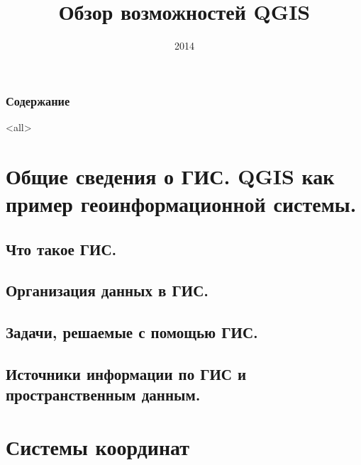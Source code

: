 \documentclass[ignorenonframetext,russian,hyperref={pdftex,unicode}]{beamer}        %
\title{Обзор возможностей QGIS}
\institute{NextGIS}
\date{2014}
\begin{document}
\frame{\titlepage}

\begin{frame}[allowframebreaks]
    \frametitle{Содержание}
       \tableofcontents
\end{frame}



\mode<all>

\section{Общие сведения о ГИС. QGIS как пример геоинформационной системы.}
    \subsection{Что такое ГИС.}
    

    \subsection{Организация данных в ГИС.}
    

    \subsection{Задачи, решаемые с помощью ГИС.}
    


    \subsection{Источники информации по ГИС и пространственным данным.}
    


\section{Системы координат}
\end{document}
